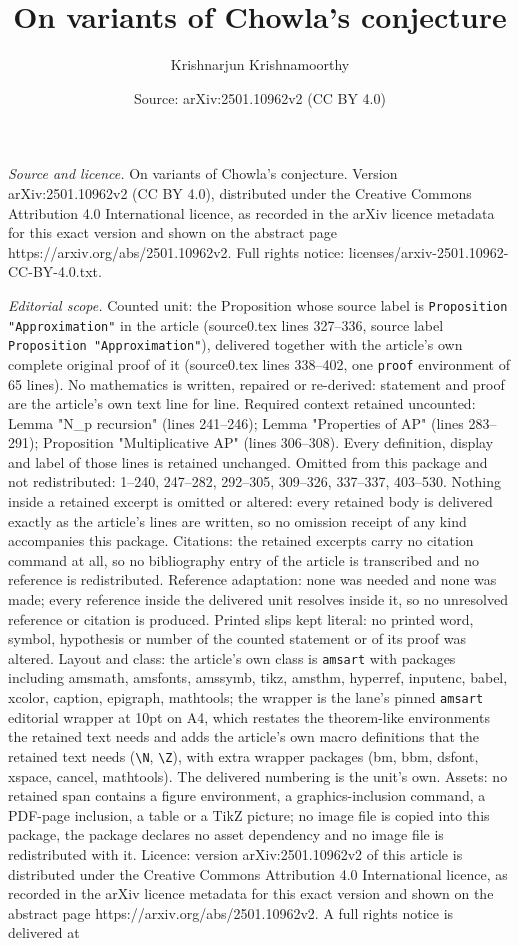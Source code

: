 \documentclass[10pt,a4paper]{amsart}
\title[On variants of Chowla's conjecture]{On variants of Chowla's conjecture}
\author{Krishnarjun Krishnamoorthy}
\date{Source: arXiv:2501.10962v2 (CC BY 4.0)}
\begin{document}
\maketitle

\noindent\emph{Source and licence.} On variants of Chowla's conjecture. Version arXiv:2501.10962v2 (CC BY 4.0), distributed under the Creative Commons Attribution 4.0 International licence, as recorded in the arXiv licence metadata for this exact version and shown on the abstract page https://arxiv.org/abs/2501.10962v2. Full rights notice: licenses/arxiv-2501.10962-CC-BY-4.0.txt.\par\smallskip

\noindent\textit{Editorial scope.} Counted unit: the Proposition whose source label is \texttt{Proposition "Approximation"} in the article (source0.tex lines 327--336, source label \texttt{Proposition "Approximation"}), delivered together with the article's own complete original proof of it (source0.tex lines 338--402, one \texttt{proof} environment of 65 lines). No mathematics is written, repaired or re-derived: statement and proof are the article's own text line for line. Required context retained uncounted: Lemma "N\_p recursion" (lines 241--246); Lemma "Properties of AP" (lines 283--291); Proposition "Multiplicative AP" (lines 306--308). Every definition, display and label of those lines is retained unchanged. Omitted from this package and not redistributed: 1--240, 247--282, 292--305, 309--326, 337--337, 403--530. Nothing inside a retained excerpt is omitted or altered: every retained body is delivered exactly as the article's lines are written, so no omission receipt of any kind accompanies this package. Citations: the retained excerpts carry no citation command at all, so no bibliography entry of the article is transcribed and no reference is redistributed. Reference adaptation: none was needed and none was made; every reference inside the delivered unit resolves inside it, so no unresolved reference or citation is produced. Printed slips kept literal: no printed word, symbol, hypothesis or number of the counted statement or of its proof was altered. Layout and class: the article's own class is \texttt{amsart} with packages including amsmath, amsfonts, amssymb, tikz, amsthm, hyperref, inputenc, babel, xcolor, caption, epigraph, mathtools; the wrapper is the lane's pinned \texttt{amsart} editorial wrapper at 10pt on A4, which restates the theorem-like environments the retained text needs and adds the article's own macro definitions that the retained text needs (\texttt{\textbackslash N}, \texttt{\textbackslash Z}), with extra wrapper packages (bm, bbm, dsfont, xspace, cancel, mathtools). The delivered numbering is the unit's own. Assets: no retained span contains a figure environment, a graphics-inclusion command, a PDF-page inclusion, a table or a TikZ picture; no image file is copied into this package, the package declares no asset dependency and no image file is redistributed with it. Licence: version arXiv:2501.10962v2 of this article is distributed under the Creative Commons Attribution 4.0 International licence, as recorded in the arXiv licence metadata for this exact version and shown on the abstract page https://arxiv.org/abs/2501.10962v2. A full rights notice is delivered at 
\end{document}

